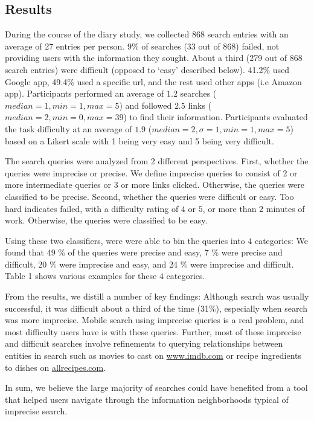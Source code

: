 \subsection{Results}


During the course of the diary study, we collected $868$ search entries with an average of 27 entries per person. 9\% of searches (33 out of 868) failed, not providing users with the information they sought. About a third (279 out of 868 search entries) were difficult (opposed to `easy' described below). 41.2\% used Google app, 49.4\% used a specific url, and the rest used other apps (i.e Amazon app). Participants performed an average of $1.2$ searches ($median=1, min =1, max=5$) and followed $2.5$ links ($median=2, min=0, max=39$) to find their information. Participants evaluated the task difficulty at an average of $1.9$ ($median=2,  \sigma=1, min=1, max=5$) based on a Likert scale with 1 being very easy and 5 being very difficult. 

The search queries were analyzed from 2 different perspectives. First, whether the queries were imprecise or precise. We define imprecise queries to consist of 2 or more intermediate queries or 3 or more links clicked. Otherwise, the queries were classified to be precise. Second, whether the queries were difficult or easy. Too hard indicates failed, with a difficulty rating of $4$ or $5$, or more than $2$ minutes of work. Otherwise, the queries were classified to be easy. 

Using these two classifiers, were were able to bin the queries into $4$ categories: We found that 49 \% of the queries were precise and easy, 7 \% were precise and difficult, 20 \% were imprecise and easy, and 24 \% were imprecise and difficult. Table 1 shows various examples for these $4$ categories.

From the results, we distill a number of key findings: Although search was usually successful, it was difficult about a third of the time (31\%), especially when search was more imprecise. Mobile search using imprecise queries is a real problem, and most difficulty users have is with these queries. Further, most of these imprecise and difficult searches involve refinements to querying relationships between entities in search such as movies to cast on \url{www.imdb.com} or recipe ingredients to dishes on \url{allrecipes.com}.

In sum, we believe the large majority of searches could have benefited from a tool that helped users navigate through the information neighborhoods typical of imprecise search. 

